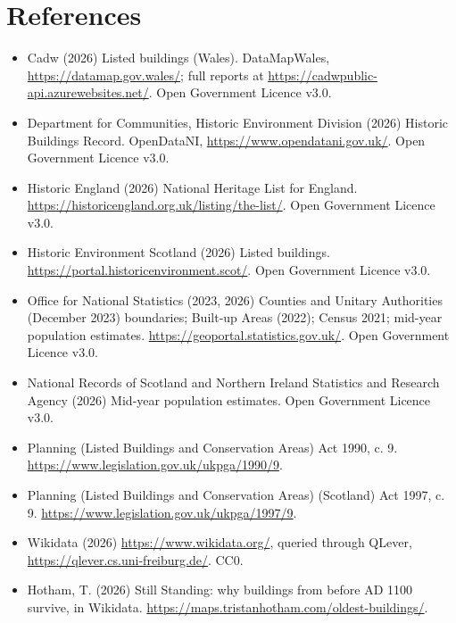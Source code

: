 \documentclass[11pt,a4paper]{article}
\begin{document}
\section*{References}
\small
\begin{itemize}\setlength{\itemsep}{2pt}
\item Cadw (2026) Listed buildings (Wales). DataMapWales, \url{https://datamap.gov.wales/}; full reports at \url{https://cadwpublic-api.azurewebsites.net/}. Open Government Licence v3.0.
\item Department for Communities, Historic Environment Division (2026) Historic Buildings Record. OpenDataNI, \url{https://www.opendatani.gov.uk/}. Open Government Licence v3.0.
\item Historic England (2026) National Heritage List for England. \url{https://historicengland.org.uk/listing/the-list/}. Open Government Licence v3.0.
\item Historic Environment Scotland (2026) Listed buildings. \url{https://portal.historicenvironment.scot/}. Open Government Licence v3.0.
\item Office for National Statistics (2023, 2026) Counties and Unitary Authorities (December 2023) boundaries; Built-up Areas (2022); Census 2021; mid-year population estimates. \url{https://geoportal.statistics.gov.uk/}. Open Government Licence v3.0.
\item National Records of Scotland and Northern Ireland Statistics and Research Agency (2026) Mid-year population estimates. Open Government Licence v3.0.
\item Planning (Listed Buildings and Conservation Areas) Act 1990, c. 9. \url{https://www.legislation.gov.uk/ukpga/1990/9}.
\item Planning (Listed Buildings and Conservation Areas) (Scotland) Act 1997, c. 9. \url{https://www.legislation.gov.uk/ukpga/1997/9}.
\item Wikidata (2026) \url{https://www.wikidata.org/}, queried through QLever, \url{https://qlever.cs.uni-freiburg.de/}. CC0.
\item Hotham, T. (2026) Still Standing: why buildings from before AD 1100 survive, in Wikidata. \url{https://maps.tristanhotham.com/oldest-buildings/}.
\end{itemize}
\end{document}
